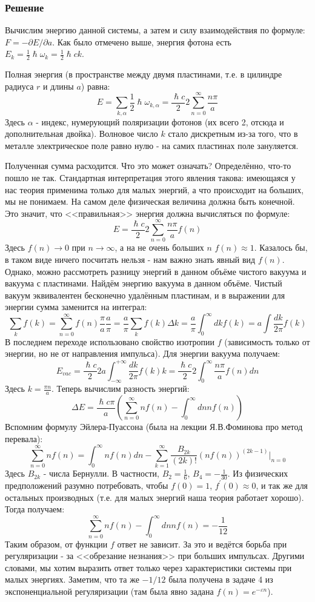 \documentclass[a4paper,12pt]{article}
\begin{document}
\subsubsection*{Решение}
Вычислим энергию данной системы, а затем и силу взаимодействия по формуле: $F=-\partial E/\partial a$. Как было отмечено выше, энергия фотона есть $E_{k}=\frac{1}{2}\hslash\omega_k=\frac{1}{2}\hslash ck$.

\noindent
Полная энергия (в пространстве между двумя пластинами, т.е. в цилиндре радиуса $r$ и длины $a$) равна:
$$
E=\sum_{k,\alpha}\frac{1}{2}\hslash\omega_{k,\alpha}=\frac{\hslash c}{2}2\sum_{n=0}^{\infty}\frac{n\pi}{a}
$$
Здесь $\alpha$ - индекс, нумерующий поляризации фотонов (их всего 2, отсюда и дополнительная двойка). Волновое число $k$ стало дискретным из-за того, что в металле электрическое поле равно нулю - на самих пластинах поле зануляется.

\noindent
Полученная сумма расходится. Что это может означать? Определённо, что-то пошло не так. Стандартная интерпретация этого явления такова: имеющаяся у нас теория применима только для малых энергий, а что происходит на больших, мы не понимаем. На самом деле физическая величина должна быть конечной. Это значит, что <<правильная>> энергия должна вычисляться по формуле:
$$
E=\frac{\hslash c}{2}2\sum_{n=0}^{\infty}\frac{n\pi}{a}f(n)
$$
Здесь $f(n)\to0$ при $n\to\infty$, а на не очень больших $n$ $f(n)\approx1$. Казалось бы, в таком виде ничего посчитать нельзя - нам важно знать явный вид $f(n)$. Однако, можно рассмотреть разницу энергий в данном объёме чистого вакуума и вакуума с пластинами. Найдём энергию вакуума в данном объёме. Чистый вакуум эквивалентен бесконечно удалённым пластинам, и в выражении для энергии сумма заменится на интеграл:
$$
\sum_{k}f(k)=\sum_{n=0}^{\infty}f(n)\frac{\pi}{a}\frac{a}{\pi}=\frac{a}{\pi}\sum_{k}f(k)\Delta k=\frac{a}{\pi}\int_0^{\infty}dkf(k)=a\int\frac{dk}{2\pi}f(k)
$$
В последнем переходе использовано свойство изотропии $f$ (зависимость только от энергии, но не от направления импульса). Для энергии вакуума получаем:
$$
E_{vac}=\frac{\hslash c}{2}2 a\int_{-\infty}^{+\infty}\frac{dk}{2\pi}f(k)k= \frac{\hslash c}{2}2\int_0^{\infty}\frac{n\pi}{a}f(n)dn
$$
Здесь $k=\frac{\pi n}{a}$. 
Теперь вычислим разность энергий:
$$
\Delta E=\frac{\hslash c\pi}{a}\left(\sum_{n=0}^{\infty}nf(n)-\int_0^{\infty}dn nf(n)\right)
$$
Вспомним формулу Эйлера-Пуассона (была на лекции Я.В.Фоминова про метод перевала):
$$
\sum_{n=0}^{\infty}nf(n)=\int_{0}^{\infty}nf(n)dn-\sum_{k=1}^{\infty}\frac{B_{2k}}{(2k)!}\left(nf(n)\right)^{(2k-1)}\vert_{n=0}
$$
Здесь $B_{2k}$ - числа Бернулли. В частности, $B_2=\frac{1}{6}$, $B_4=-\frac{1}{30}$. Из физических предположений разумно потребовать, чтобы $f(0)=1$, $f^{'}(0)\approx0$, и так же для остальных производных (т.е. для малых энергий наша теория работает хорошо). Тогда получаем:
$$
\sum_{n=0}^{\infty}nf(n)-\int_0^{\infty}dn nf(n)=-\frac{1}{12}
$$
Таким образом, от функции $f$ ответ не зависит. За это и ведётся борьба при регуляризации - за <<обрезание незнания>> при больших импульсах. Другими словами, мы хотим выразить ответ только через характеристики системы при малых энергиях. Заметим, что та же $-1/12$ была получена в задаче 4 из экспоненциальной регуляризации (там была явно задана $f(n)=e^{-\varepsilon n}$).
\end{document}
